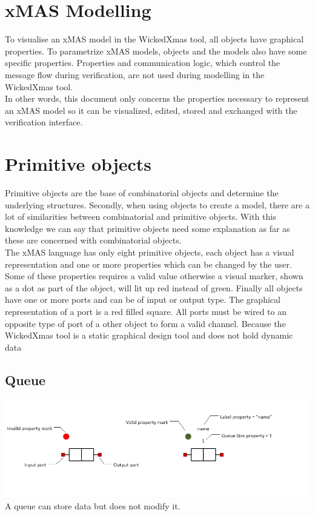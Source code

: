 \documentclass[a4paper,11pt,final]{article}
\begin{document}
\section{xMAS Modelling}
To visualise an xMAS model in the WickedXmas tool, all objects have graphical properties. To parametrize xMAS models, objects and the models also have some specific properties. Properties and communication logic, which control the message flow during verification, are not used during modelling in the WickedXmas tool.
\\In other words, this document only concerns the properties necessary to represent an xMAS model so it can be visualized, edited, stored and exchanged with the verification interface.
 

\newpage
\section{Primitive objects}
Primitive objects are the base of combinatorial objects and determine the underlying structures. Secondly, when using objects to create a model, there are a lot of similarities between combinatorial and primitive objects. With this knowledge we can say that primitive objects need some explanation as far as these are concerned with combinatorial objects.
\\The xMAS language has only eight primitive objects, each object has a visual representation and one or more properties which can be changed by the user. Some of these properties requires a valid value otherwise a visual marker, shown as a dot as part of the object, will lit up red instead of green. Finally all objects have one or more ports and can be of input or output type. The graphical representation of a port is a red filled square. All ports must be wired to an opposite type of port of a other object to form a valid channel.
Because the WickedXmas tool is a static graphical design tool and does not hold dynamic data


\subsection{Queue}
\includegraphics[width=1.0\textwidth]{queue}
A queue can store data but does not modify it.  
\end{document}
